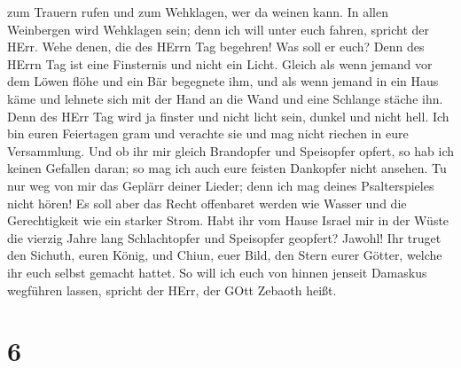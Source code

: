 zum Trauern rufen und zum Wehklagen, wer da weinen kann. 
In allen Weinbergen wird Wehklagen sein; denn ich will unter euch
fahren, spricht der HErr.  Wehe denen, die des HErrn Tag
begehren! Was soll er euch? Denn des HErrn Tag ist eine Finsternis und
nicht ein Licht.  Gleich als wenn jemand vor dem Löwen
flöhe und ein Bär begegnete ihm, und als wenn jemand in ein Haus käme
und lehnete sich mit der Hand an die Wand und eine Schlange stäche ihn.
 Denn des HErr Tag wird ja finster und nicht licht sein,
dunkel und nicht hell.  Ich bin euren Feiertagen gram und
verachte sie und mag nicht riechen in eure Versammlung. 
Und ob ihr mir gleich Brandopfer und Speisopfer opfert, so hab ich
keinen Gefallen daran; so mag ich auch eure feisten Dankopfer nicht
ansehen.  Tu nur weg von mir das Geplärr deiner Lieder;
denn ich mag deines Psalterspieles nicht hören!  Es soll
aber das Recht offenbaret werden wie Wasser und die Gerechtigkeit wie
ein starker Strom.  Habt ihr vom Hause Israel mir in der
Wüste die vierzig Jahre lang Schlachtopfer und Speisopfer geopfert?
Jawohl!  Ihr truget den Sichuth, euren König, und Chiun,
euer Bild, den Stern eurer Götter, welche ihr euch selbst gemacht
hattet.  So will ich euch von hinnen jenseit Damaskus
wegführen lassen, spricht der HErr, der GOtt Zebaoth heißt.

\hypertarget{section-5}{%
\section{6}\label{section-5}}

